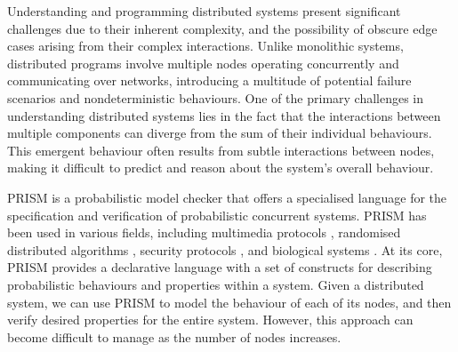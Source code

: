 Understanding and programming distributed systems 
%
present significant challenges due to their inherent complexity, and
the possibility of obscure edge cases arising from their complex
interactions.
%
Unlike monolithic systems, distributed programs involve multiple nodes
operating concurrently and communicating over networks, introducing a
multitude of potential failure scenarios and nondeterministic
behaviours.
%
One of the primary challenges in understanding distributed systems
lies in the fact that the interactions between multiple components can
diverge from the sum of their individual behaviours. This emergent
behaviour often results from subtle interactions between nodes, making
it difficult to predict and reason about the system's overall
behaviour.

PRISM \cite{PRISMdoc} is a probabilistic model checker that offers a
specialised language for the specification and verification of
probabilistic concurrent systems. PRISM has been used in various
fields, including multimedia protocols \cite{multimedia}, randomised
distributed algorithms \cite{distr1,distr2}, security protocols
\cite{security1,security2}, and biological systems \cite{bio1,bio2}.
At its core, PRISM provides a declarative language with a set of
constructs for describing probabilistic behaviours and properties
within a system.
%
Given a distributed system, we can use PRISM to model the behaviour of
each of its nodes,
and then verify desired properties for the entire system. However,
this approach can become difficult to manage as the number of nodes
increases.

%

